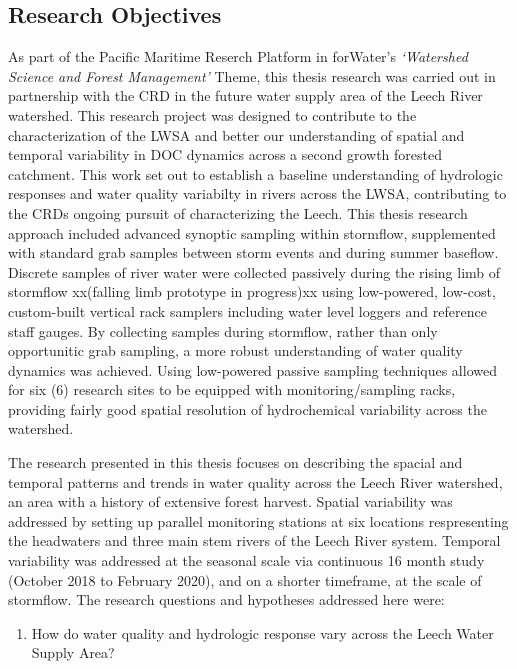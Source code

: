 \documentclass[]{article}
\providecommand{\tightlist}{%
  \setlength{\itemsep}{0pt}\setlength{\parskip}{0pt}}
\begin{document}
\subsection{Research Objectives}\label{research-objectives}

As part of the Pacific Maritime Reserch Platform in forWater's
\emph{`Watershed Science and Forest Management'} Theme, this thesis
research was carried out in partnership with the CRD in the future water
supply area of the Leech River watershed. This research project was
designed to contribute to the characterization of the LWSA and better
our understanding of spatial and temporal variability in DOC dynamics
across a second growth forested catchment. This work set out to
establish a baseline understanding of hydrologic responses and water
quality variabilty in rivers across the LWSA, contributing to the CRDs
ongoing pursuit of characterizing the Leech. This thesis research
approach included advanced synoptic sampling within stormflow,
supplemented with standard grab samples between storm events and during
summer baseflow. Discrete samples of river water were collected
passively during the rising limb of stormflow xx(falling limb prototype
in progress)xx using low-powered, low-cost, custom-built vertical rack
samplers including water level loggers and reference staff gauges. By
collecting samples during stormflow, rather than only opportunitic grab
sampling, a more robust understanding of water quality dynamics was
achieved. Using low-powered passive sampling techniques allowed for six
(6) research sites to be equipped with monitoring/sampling racks,
providing fairly good spatial resolution of hydrochemical variability
across the watershed.

The research presented in this thesis focuses on describing the spacial
and temporal patterns and trends in water quality across the Leech River
watershed, an area with a history of extensive forest harvest. Spatial
variability was addressed by setting up parallel monitoring stations at
six locations respresenting the headwaters and three main stem rivers of
the Leech River system. Temporal variability was addressed at the
seasonal scale via continuous 16 month study (October 2018 to February
2020), and on a shorter timeframe, at the scale of stormflow. The
research questions and hypotheses addressed here were:

\begin{enumerate}
\def\labelenumi{\arabic{enumi}.}
\tightlist
\item
  How do water quality and hydrologic response vary across the Leech
  Water Supply Area?
\end{enumerate}
\end{document}
